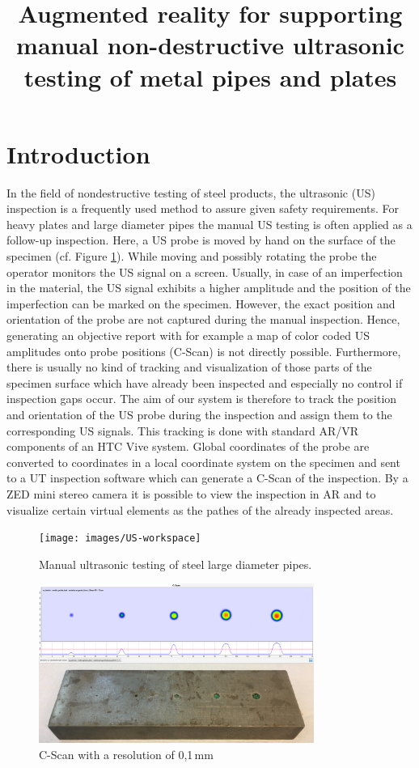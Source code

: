 \documentclass{VRARWorkshop}
\title{Augmented reality for supporting manual non-destructive ultrasonic testing of metal pipes and plates}
\begin{document}
\section{Introduction}

In the field of nondestructive testing of steel products, the ultrasonic (US) inspection is a frequently used method to assure given safety requirements. For heavy plates and large diameter pipes the manual US testing is often applied as a follow-up inspection. Here, a US probe is moved by hand on the surface of the specimen (cf. Figure \ref{fig:manual_UT}). While moving and possibly rotating the probe the operator monitors the US signal on a screen. Usually, in case of an imperfection in the material, the US signal exhibits a higher amplitude and the position of the imperfection can be marked on the specimen.
However, the exact position and orientation of the probe are not captured during the manual inspection. Hence, generating an objective report with for example a map of color coded US amplitudes onto probe positions (C-Scan) is not directly possible. Furthermore, there is usually no kind of tracking and visualization of those parts of the specimen surface which have already been inspected and especially no control if inspection gaps occur.
The aim of our system is therefore to track the position and orientation of the US probe during the inspection and assign them to the corresponding US signals. This tracking is done with standard AR/VR components of an HTC Vive system. Global coordinates of the probe are converted to coordinates in a local coordinate system on the specimen and sent to a UT inspection software which can generate a C-Scan of the inspection. By a ZED mini stereo camera it is possible to view the inspection in AR and to visualize certain virtual elements as the pathes of the already inspected areas.

\begin{figure}[h!]
    \begin{center}
        \texttt{[image: images/US-workspace]}
        \caption{\label{fig:manual_UT} Manual ultrasonic testing of steel large diameter pipes.}
    \end{center}
\end{figure}

\begin{figure}[h!]
    \begin{center}
        \includegraphics[width=90mm]{images/CScan}
        \caption{\label{fig:cScan} C-Scan with a resolution of 0,1\,mm}
    \end{center}
\end{figure}
\end{document}
